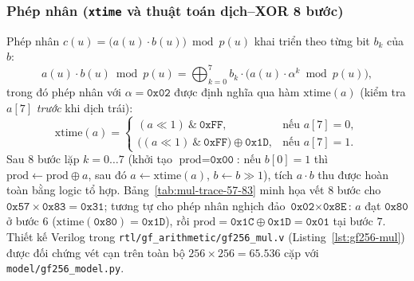\documentclass[11pt,a4paper]{report}
\begin{document}
\subsubsection{Phép nhân (\texttt{xtime} và thuật toán dịch--XOR 8 bước)}
Phép nhân $c(u) = \bigl(a(u) \cdot b(u)\bigr) \bmod p(u)$ khai triển theo từng bit $b_k$ của $b$:
\begin{equation}
    a(u) \cdot b(u) \bmod p(u) = \bigoplus_{k=0}^{7} b_k \cdot \bigl(a(u) \cdot \alpha^k \bmod p(u)\bigr),
    \label{eq:gf-mul-shift}
\end{equation}
trong đó phép nhân với $\alpha = \texttt{0x02}$ được định nghĩa qua hàm $\text{xtime}(a)$ (kiểm tra $a[7]$ \textit{trước} khi dịch trái):
\begin{equation}
    \text{xtime}(a) =
    \begin{cases}
        (a \ll 1) \ \& \ \texttt{0xFF}, & \text{nếu } a[7] = 0, \\
        \bigl((a \ll 1) \ \& \ \texttt{0xFF}\bigr) \oplus \texttt{0x1D}, & \text{nếu } a[7] = 1.
    \end{cases}
    \label{eq:xtime}
\end{equation}
Sau $8$ bước lặp $k = 0 \dots 7$ (khởi tạo $\text{prod} = \texttt{0x00}$: nếu $b[0]=1$ thì $\text{prod} \leftarrow \text{prod} \oplus a$, sau đó $a \leftarrow \text{xtime}(a)$, $b \leftarrow b \gg 1$), tích $a \cdot b$ thu được hoàn toàn bằng logic tổ hợp. Bảng~\ref{tab:mul-trace-57-83} minh họa vết 8 bước cho $\texttt{0x57} \times \texttt{0x83} = \texttt{0x31}$; tương tự cho phép nhân nghịch đảo $\texttt{0x02} \times \texttt{0x8E}$: $a$ đạt $\texttt{0x80}$ ở bước $6$ ($\text{xtime}(\texttt{0x80}) = \texttt{0x1D}$), rồi $\text{prod} = \texttt{0x1C} \oplus \texttt{0x1D} = \texttt{0x01}$ tại bước $7$. Thiết kế Verilog trong \texttt{rtl/gf\_arithmetic/gf256\_mul.v} (Listing~\ref{lst:gf256-mul}) được đối chứng vét cạn trên toàn bộ $256 \times 256 = 65.536$ cặp với \texttt{model/gf256\_model.py}.
\end{document}
